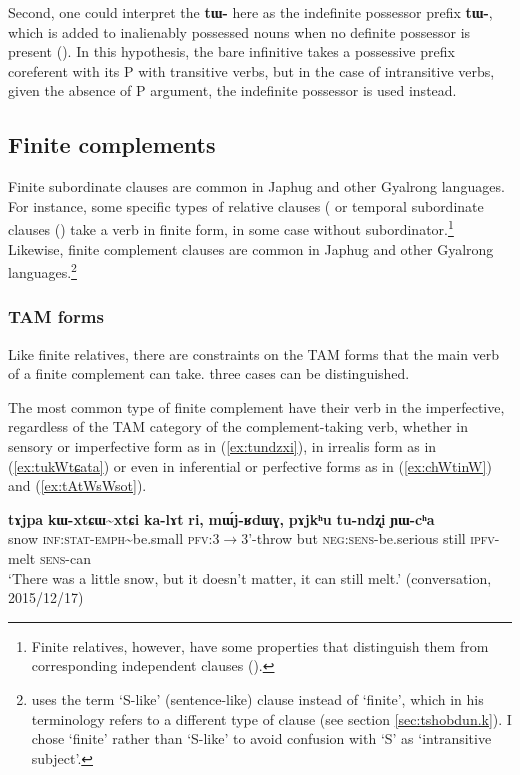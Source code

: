 \documentclass[oneside,a4paper,11pt]{article}
\newcommand{\ipa}[1]{\textbf{\phon#1}} %
\newcommand{\tld}{\textasciitilde{}}
\begin{document}
Second, one could interpret the \ipa{tɯ-} here as the indefinite possessor prefix \ipa{tɯ-}, which is added to inalienably possessed nouns when no definite possessor is present (\citealt{jacques15generic}). In this hypothesis, the bare infinitive takes a possessive prefix coreferent with its P with transitive verbs, but in the case of intransitive verbs, given the absence of P argument, the indefinite possessor is used instead.

 \subsection{Finite complements} 
Finite subordinate clauses are common in Japhug and other Gyalrong languages. For instance, some specific types of relative clauses (\citealt{jackson06guanxiju, jacques16relatives} or temporal subordinate clauses (\citealt{jacques14linking}) take a verb in finite form, in some case without subordinator.\footnote{Finite relatives, however, have some properties that distinguish them from corresponding independent clauses (\citealt[18-21]{jacques16relatives}).} Likewise, finite complement clauses are common in Japhug and other Gyalrong languages.\footnote{\citet[475-7]{sun12complementation} uses the term `S-like' (sentence-like) clause instead of `finite', which in his terminology refers to a different type of clause (see section \ref{sec:tshobdun.k}). I chose `finite' rather than `S-like' to avoid confusion with `S' as  `intransitive subject'. }


\subsubsection{TAM forms} \label{sec:TAM.finite}
Like finite relatives, there are constraints on the TAM forms that the main verb of a finite complement can take. three cases can be distinguished.

The most common type of finite complement have their verb in the imperfective, regardless of the TAM category of the complement-taking verb, whether in sensory or imperfective form as in (\ref{ex:tundzxi}), in irrealis form as in (\ref{ex:tukWtɕata}) or even in inferential or perfective forms as in (\ref{ex:chWtinW}) and (\ref{ex:tAtWsWsot}).

\begin{exe}
\ex \label{ex:tundzxi}
\gll 
\ipa{tɤjpa} 	\ipa{kɯ-xtɕɯ\tld{}xtɕi} 	\ipa{ka-lɤt} 	\ipa{ri,} 	\ipa{mɯ́j-ʁdɯɣ,} 	\ipa{pɤjkʰu} 	\ipa{tu-ndʐi} 	\ipa{ɲɯ-cʰa} \\
snow \textsc{inf:stat-emph}\tld{}be.small \textsc{pfv}:3$\rightarrow$3'-throw but \textsc{neg:sens}-be.serious still \textsc{ipfv}-melt \textsc{sens}-can \\
\glt `There was a little snow, but it doesn't matter, it can still melt.' (conversation, 2015/12/17)
\end{exe}
\end{document}
